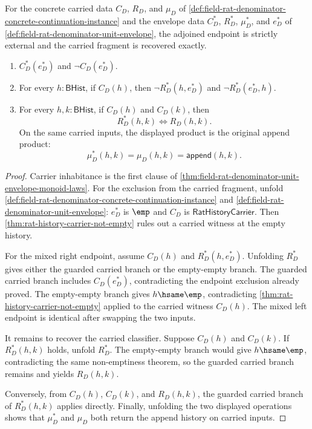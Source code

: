 \begin{theorem}
\label{thm:field-rat-denominator-unit-envelope-strict}
For the concrete carried data $C_D$, $R_D$, and $\mu_D$ of
\autoref{def:field-rat-denominator-concrete-continuation-instance} and the
envelope data $C_D^\ast$, $R_D^\ast$, $\mu_D^\ast$, and $e_D^\ast$ of
\autoref{def:field-rat-denominator-unit-envelope}, the adjoined endpoint is
strictly external and the carried fragment is recovered exactly.
\begin{enumerate}
  \item $C_D^\ast(e_D^\ast)$ and $\neg C_D(e_D^\ast)$.
  \item For every $h:\mathsf{BHist}$, if $C_D(h)$, then
  $\neg R_D^\ast(h,e_D^\ast)$ and $\neg R_D^\ast(e_D^\ast,h)$.
  \item For every $h,k:\mathsf{BHist}$, if $C_D(h)$ and $C_D(k)$, then
  $$
  R_D^\ast(h,k)\Longleftrightarrow R_D(h,k).
  $$
  On the same carried inputs, the displayed product is the original append
  product:
  $$
  \mu_D^\ast(h,k)=\mu_D(h,k)=\mathsf{append}(h,k).
  $$
\end{enumerate}
\end{theorem}
\begin{proof}
Carrier inhabitance is the first clause of
\autoref{thm:field-rat-denominator-unit-envelope-monoid-laws}. For the
exclusion from the carried fragment, unfold
\autoref{def:field-rat-denominator-concrete-continuation-instance} and
\autoref{def:field-rat-denominator-unit-envelope}: $e_D^\ast$ is $\emp$ and
$C_D$ is $\mathsf{RatHistoryCarrier}$. Then
\autoref{thm:rat-history-carrier-not-empty} rules out a carried witness at the
empty history.

For the mixed right endpoint, assume $C_D(h)$ and
$R_D^\ast(h,e_D^\ast)$. Unfolding $R_D^\ast$ gives either the guarded carried
branch or the empty-empty branch. The guarded carried branch includes
$C_D(e_D^\ast)$, contradicting the endpoint exclusion already proved. The
empty-empty branch gives $h\hsame\emp$, contradicting
\autoref{thm:rat-history-carrier-not-empty} applied to the carried witness
$C_D(h)$. The mixed left endpoint is identical after swapping the two inputs.

It remains to recover the carried classifier. Suppose $C_D(h)$ and $C_D(k)$.
If $R_D^\ast(h,k)$ holds, unfold $R_D^\ast$. The empty-empty branch would give
$h\hsame\emp$, contradicting the same non-emptiness theorem, so the guarded
carried branch remains and yields $R_D(h,k)$.

Conversely, from $C_D(h)$, $C_D(k)$, and $R_D(h,k)$, the guarded carried branch
of $R_D^\ast(h,k)$ applies directly. Finally, unfolding the two displayed
operations shows that $\mu_D^\ast$ and $\mu_D$ both return the append history
on carried inputs.
\end{proof}

